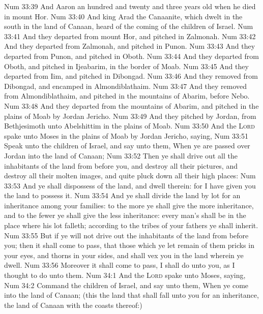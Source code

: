 \vs Num 33:39 And Aaron  an hundred and twenty and three years old when he died in mount Hor.
\vs Num 33:40 And king Arad the Canaanite, which dwelt in the south in the land of Canaan, heard of the coming of the children of Israel.
\vs Num 33:41 And they departed from mount Hor, and pitched in Zalmonah.
\vs Num 33:42 And they departed from Zalmonah, and pitched in Punon.
\vs Num 33:43 And they departed from Punon, and pitched in Oboth.
\vs Num 33:44 And they departed from Oboth, and pitched in Ijeabarim, in the border of Moab.
\vs Num 33:45 And they departed from Iim, and pitched in Dibongad.
\vs Num 33:46 And they removed from Dibongad, and encamped in Almondiblathaim.
\vs Num 33:47 And they removed from Almondiblathaim, and pitched in the mountains of Abarim, before Nebo.
\vs Num 33:48 And they departed from the mountains of Abarim, and pitched in the plains of Moab by Jordan  Jericho.
\vs Num 33:49 And they pitched by Jordan, from Bethjesimoth  unto Abelshittim in the plains of Moab.
\vs Num 33:50 And the \textsc{Lord} spake unto Moses in the plains of Moab by Jordan  Jericho, saying,
\vs Num 33:51 Speak unto the children of Israel, and say unto them, When ye are passed over Jordan into the land of Canaan;
\vs Num 33:52 Then ye shall drive out all the inhabitants of the land from before you, and destroy all their pictures, and destroy all their molten images, and quite pluck down all their high places:
\vs Num 33:53 And ye shall dispossess  of the land, and dwell therein: for I have given you the land to possess it.
\vs Num 33:54 And ye shall divide the land by lot for an inheritance among your families:  to the more ye shall give the more inheritance, and to the fewer ye shall give the less inheritance: every man's  shall be in the place where his lot falleth; according to the tribes of your fathers ye shall inherit.
\vs Num 33:55 But if ye will not drive out the inhabitants of the land from before you; then it shall come to pass, that those which ye let remain of them  pricks in your eyes, and thorns in your sides, and shall vex you in the land wherein ye dwell.
\vs Num 33:56 Moreover it shall come to pass,  I shall do unto you, as I thought to do unto them.
\vs Num 34:1 And the \textsc{Lord} spake unto Moses, saying,
\vs Num 34:2 Command the children of Israel, and say unto them, When ye come into the land of Canaan; (this  the land that shall fall unto you for an inheritance,  the land of Canaan with the coasts thereof:)
